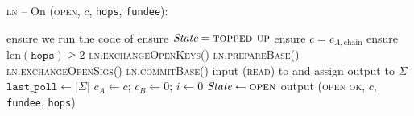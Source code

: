 \begin{center}
  \begin{processbox}{\textsc{ln} -- On (\textsc{open}, $c$, \texttt{hops},
  \texttt{fundee}):}
    \ \\
    \begin{algorithmic}[1]
      \State {}
      \label{code:ln:open:alice-open}
      \State ensure we run the code of \alice{} 
       
        \State ensure $\itistate = \textsc{topped up}$
        \State ensure $c = c_{A, \mathrm{chain}}$
      \Else \: 
        \State ensure $\mathrm{len}(\texttt{hops}) \geq 2$ 
      \EndIf
      \State \textsc{ln.exchangeOpenKeys}()
      \State \textsc{ln.prepareBase}()
      \State \textsc{ln.exchangeOpenSigs}()
        \State \textsc{ln.commitBase}()
      \EndIf
      \State input (\textsc{read}) to \ledger and assign output to $\Sigma$
      \State $\texttt{last\_poll} \gets |\Sigma|$
      \State $c_A \gets c$; $c_B \gets 0$; $i \gets 0$
      \State $\itistate \gets \textsc{open}$
      \label{code:ln:open:state-open}
      \State output (\textsc{open ok}, $c$, \texttt{fundee}, \texttt{hops})
    \end{algorithmic}
  \end{processbox}
  \label{code:ln:open}
\end{center} \ \\

